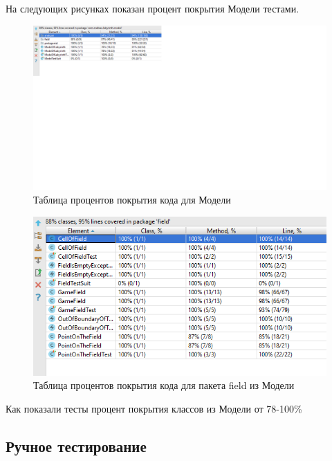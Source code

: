 На следующих рисунках показан процент покрытия Модели тестами.

\begin{figure}[H]
	\begin{center}
		\includegraphics[scale=0.7]{pics/tests1.png}
		\caption{Таблица процентов покрытия кода для Модели} 
		\label{pic:pic_name} %
	\end{center}
\end{figure}



\begin{figure}[H]
	\begin{center}
		\includegraphics[scale=0.7]{pics/tests.png}
		\caption{Таблица процентов покрытия кода для пакета field из Модели} 
		\label{pic:pic_name} %
	\end{center}
\end{figure}

Как показали тесты процент покрытия классов из Модели от 78-100\%

\subsection{Ручное тестирование}

